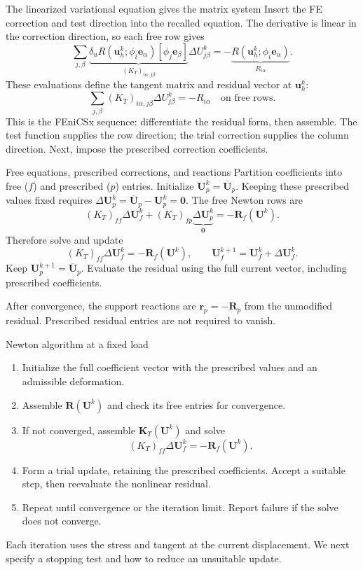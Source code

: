 \documentclass[11pt,aspectratio=169]{beamer}
\newcommand{\bu}{\bm u}
\newcommand{\bU}{\bm U}
\newcommand{\bR}{\bm R}
\newcommand{\bK}{\bm K}
\begin{document}
\begin{frame}{The linearized variational equation gives the matrix system}
Insert the FE correction and test direction into the recalled equation.
The derivative is linear in the correction direction, so each free row gives
\[
\sum_{j,\beta}
\underbrace{\delta_uR(\bu_h^k;\phi_i\bm e_\alpha)
[\phi_j\bm e_\beta]}_{(K_T)_{i\alpha,j\beta}}
\Delta U_{j\beta}^k
=-\underbrace{R(\bu_h^k;\phi_i\bm e_\alpha)}_{R_{i\alpha}}.
\]
These evaluations define the tangent matrix and residual vector at $\bu_h^k$:
\[
\boxed{\sum_{j,\beta}(K_T)_{i\alpha,j\beta}\Delta U_{j\beta}^k
=-R_{i\alpha}\quad\text{on free rows}.}
\]
This is the FEniCSx sequence: differentiate the residual form, then assemble.
The test function supplies the row direction; the trial correction supplies
the column direction. Next, impose the prescribed correction coefficients.
\end{frame}

\begin{frame}{Free equations, prescribed corrections, and reactions}
Partition coefficients into free ($f$) and prescribed ($p$) entries.
Initialize $\bU_p^k=\overline{\bU}_p$.
Keeping these prescribed values fixed requires
$\Delta\bU_p^k=\overline{\bU}_p-\bU_p^k=\bm0$.
The free Newton rows are
\[
(K_T)_{ff}\Delta\bU_f^k
+(K_T)_{fp}\underbrace{\Delta\bU_p^k}_{\bm0}
=-\bR_f(\bU^k).
\]
Therefore solve and update
\[
\boxed{(K_T)_{ff}\Delta\bU_f^k=-\bR_f(\bU^k),\qquad
\bU_f^{k+1}=\bU_f^k+\Delta\bU_f^k.}
\]
Keep $\bU_p^{k+1}=\overline{\bU}_p$. Evaluate the residual using the full
current vector, including prescribed coefficients.

After convergence, the support reactions are $\bm r_p=-\bR_p$ from the
unmodified residual. Prescribed residual entries are not required to vanish.
\end{frame}

\begin{frame}{Newton algorithm at a fixed load}
\begin{enumerate}
\item Initialize the full coefficient vector with the prescribed values and
an admissible deformation.
\item Assemble $\bR(\bU^k)$ and check its free entries for convergence.
\item If not converged, assemble $\bK_T(\bU^k)$ and solve
\[
(K_T)_{ff}\Delta\bU_f^k=-\bR_f(\bU^k).
\]
\item Form a trial update, retaining the prescribed coefficients. Accept a
suitable step, then reevaluate the nonlinear residual.
\item Repeat until convergence or the iteration limit. Report failure if the
solve does not converge.
\end{enumerate}
Each iteration uses the stress and tangent at the current displacement.
We next specify a stopping test and how to reduce an unsuitable update.
\end{frame}
\end{document}
